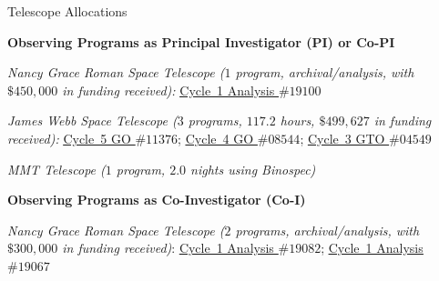 \documentclass{JMH_CV}
\begin{document}

\begin{rSection}{Telescope Allocations}

\textbf{Observing Programs as Principal Investigator (PI) or Co-PI}

\textit{Nancy Grace Roman Space Telescope (\boldmath$\mathit{1}$ program, archival/analysis, with \boldmath$\mathbf{\textit{\$}} \mathit{450{,}000}$ in funding received):}
\href{https://roman.ipac.caltech.edu/cycle1-approved-programs/19100}{\ul{Cycle~1 Analysis $\# 19100$}}

\textit{James Webb Space Telescope (\boldmath$\mathit{3}$ programs, \boldmath$\mathit{117.2}$ hours, \boldmath$\mathbf{\textit{\$}} \mathit{499{,}627}$ in funding received):}
\href{https://www.stsci.edu/jwst/science-execution/program-information?id=11376}{\ul{Cycle~5 GO $\# 11376$}};
\href{https://www.stsci.edu/jwst/science-execution/program-information?id=8544}{\ul{Cycle~4 GO $\# 08544$}};
\href{https://www.stsci.edu/jwst/science-execution/program-information?id=4549}{\ul{Cycle~3 GTO $\# 04549$}}

\textit{MMT Telescope (\boldmath$\mathit{1}$ program, \boldmath$\mathit{2.0}$ nights using Binospec)}

\textbf{Observing Programs as Co-Investigator (Co-I)}

\textit{Nancy Grace Roman Space Telescope (\boldmath$\mathit{2}$ programs, archival/analysis, with \boldmath$\mathbf{\textit{\$}} \mathit{300{,}000}$ in funding received)}:
\href{https://roman.ipac.caltech.edu/cycle1-approved-programs/19082}{\ul{Cycle~1 Analysis $\# 19082$}};
\href{https://roman.ipac.caltech.edu/cycle1-approved-programs/19067}{\ul{Cycle~1 Analysis $\# 19067$}}


\end{rSection}
\end{document}
